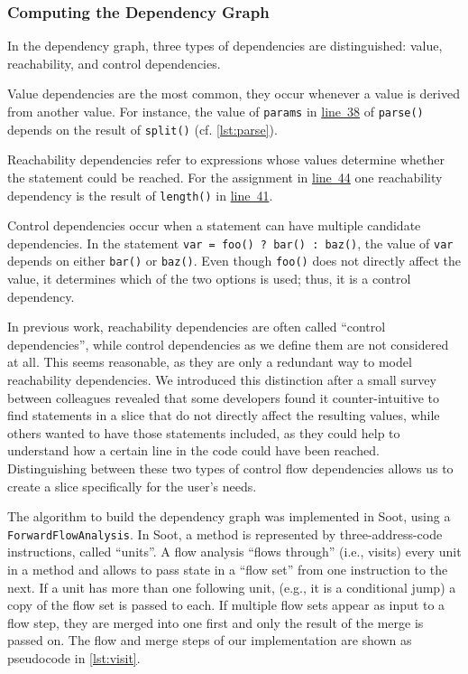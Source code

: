 \documentclass[english]{scrartcl}
\newcommand{\linerefn}[2]{\hyperref[#1]{line~#2}}
\begin{document}
\subsubsection{Computing the Dependency Graph}

In the dependency graph, three types of dependencies are distinguished: value, reachability, and control dependencies.

Value dependencies are the most common, they occur whenever a value is derived from another value.
For instance, the value of \verb+params+ in \linerefn{lst:parse}{38} of \verb+parse()+ depends on the result of \verb+split()+ (cf. \autoref{lst:parse}).

Reachability dependencies refer to expressions whose values determine whether the statement could be reached.
For the assignment in \linerefn{lst:parse}{44} one reachability dependency is the result of \verb+length()+ in \linerefn{lst:parse}{41}.

Control dependencies occur when a statement can have multiple candidate dependencies.
In the statement \lstinline{var = foo() ? bar() : baz()}, the value of \verb+var+ depends on either \verb+bar()+ or \verb+baz()+.
Even though \verb+foo()+ does not directly affect the value, it determines which of the two options is used; thus, it is a control dependency.

In previous work, reachability dependencies are often called ``control dependencies'', while control dependencies as we define them are not considered at all. 
This seems reasonable, as they are only a redundant way to model reachability dependencies.
We introduced this distinction after a small survey between colleagues revealed that some developers found it counter-intuitive to find statements in a slice that do not directly affect the resulting values, while others wanted to have those statements included, as they could help to understand how a certain line in the code could have been reached.
Distinguishing between these two types of control flow dependencies allows us to create a slice specifically for the user's needs.

The algorithm to build the dependency graph was implemented in Soot, using a \verb+ForwardFlowAnalysis+.
In Soot, a method is represented by three-address-code instructions, called ``units''.
A flow analysis ``flows through'' (i.e., visits) every unit in a method and allows to pass state in a ``flow set'' from one instruction to the next.
If a unit has more than one following unit, (e.g., it is a conditional jump) a copy of the flow set is passed to each.
If multiple flow sets appear as input to a flow step, they are merged into one first and only the result of the merge is passed on.
The flow and merge steps of our implementation are shown as pseudocode in \autoref{lst:visit}.
\end{document}
